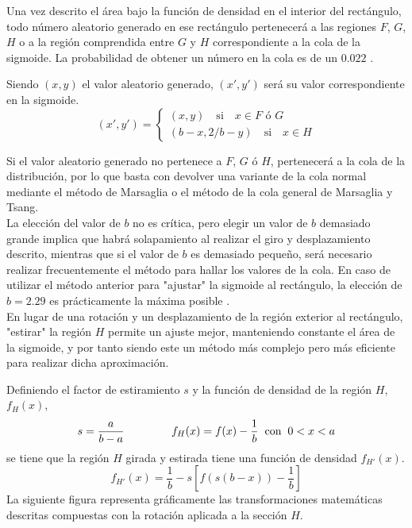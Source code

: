 \documentclass[a4paper,12pt]{article}
\begin{document}
	Una vez descrito el área bajo la función de densidad en el interior del rectángulo, todo número aleatorio generado en ese rectángulo pertenecerá a las regiones $F$, $G$, $H$ o a la región comprendida entre $G$ y $H$ correspondiente a la cola de la sigmoide. La probabilidad de obtener un número en la cola es de un $0.022$ \cite{monty-python}.
	
	Siendo $(x,y)$ el valor aleatorio generado, $(x',y')$ será su valor correspondiente en la sigmoide.
	$$
	(x',y') = 
	\begin{cases}
		(x,y) \quad \text{si} \quad x\in F \text{ ó } G \\
		(b-x,2/b-y) \quad \text{si} \quad x \in H
	\end{cases}
	$$  
	
	Si el valor aleatorio generado no pertenece a $F$, $G$ ó $H$, pertenecerá a la cola de la distribución, por lo que basta con devolver una variante de la cola normal mediante el método de Marsaglia o el método de la cola general de Marsaglia y Tsang.\\
		
	La elección del valor de $b$ no es crítica, pero elegir un valor de $b$ demasiado grande implica que habrá solapamiento al realizar el giro y desplazamiento descrito, mientras que si el valor de $b$ es demasiado pequeño, será necesario realizar frecuentemente el método para hallar los valores de la cola.
	En caso de utilizar el método anterior para "ajustar" la sigmoide al rectángulo, la elección de $b=2.29$ es prácticamente la máxima posible \cite{monty-python}. \\
		
	En lugar de una rotación y un desplazamiento de la región exterior al rectángulo, "estirar" la región $H$ permite un ajuste mejor, manteniendo constante el área de la sigmoide, y por tanto siendo este un método más complejo pero más eficiente para realizar dicha aproximación. 
	
	Definiendo el factor de estiramiento $s$ y la función de densidad de la región $H$, $f_H(x)$, 
	$$s=\dfrac{a}{b-a} \hspace{1.5cm} f_H(x)=f(x)-\dfrac{1}{b} \hspace{2mm} \text{con} \hspace{2mm} 0<x<a $$
	se tiene que la región $H$ girada y estirada tiene una función de densidad $f_{H'}(x)$.
	$$ f_{H'}(x) = \dfrac{1}{b} - s  \left[ f(s (b-x) ) -\dfrac{1}{b} \right] $$ 
	La siguiente figura representa gráficamente las transformaciones matemáticas descritas compuestas con la rotación aplicada a la sección $H$. 
	
\end{document}

